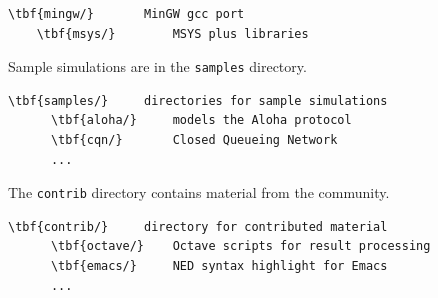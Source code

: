 \begin{Verbatim}[commandchars=\\\{\}]
    \tbf{mingw/}       MinGW gcc port
    \tbf{msys/}        MSYS plus libraries
\end{Verbatim}

Sample simulations are in the \texttt{samples} directory.

\begin{Verbatim}[commandchars=\\\{\}]
    \tbf{samples/}     directories for sample simulations
      \tbf{aloha/}     models the Aloha protocol
      \tbf{cqn/}       Closed Queueing Network
      ...
\end{Verbatim}

The \texttt{contrib} directory contains material from the {\opp} community.

\begin{Verbatim}[commandchars=\\\{\}]
    \tbf{contrib/}     directory for contributed material
      \tbf{octave/}    Octave scripts for result processing
      \tbf{emacs/}     NED syntax highlight for Emacs
      ...
\end{Verbatim}



